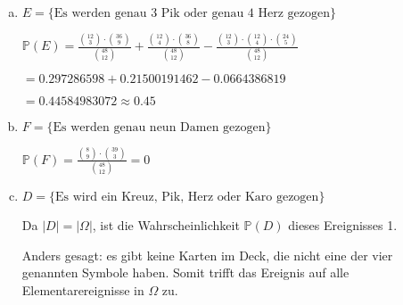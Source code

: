 \documentclass[a4paper,12pt]{article}
\begin{document}
\begin{enumerate}[(a)]
        \item
        $ E = \{\text{Es werden genau 3 Pik oder genau 4 Herz gezogen}\} $

        $ \displaystyle \mathbb{P}(E) = \frac{\binom{12}{3} \cdot \binom{36}{9}}{\binom{48}{12}} + \frac{\binom{12}{4} \cdot \binom{36}{8}}{\binom{48}{12}} - \frac{\binom{12}{3} \cdot \binom{12}{4} \cdot \binom{24}{5}}{\binom{48}{12}} $

        $ = 0.297286598 + 0.21500191462 - 0.0664386819 $

        $ = 0.44584983072 \approx 0.45 $

        \item
        $ F = \{\text{Es werden genau neun Damen gezogen}\} $

        $ \displaystyle \mathbb{P}(F) = \frac{\binom{8}{9} \cdot \binom{39}{3}}{\binom{48}{12}} = 0 $

        \item
        $ D = \{\text{Es wird ein Kreuz, Pik, Herz oder Karo gezogen}\} $

        Da $ |D| = |\Omega| $, ist die Wahrscheinlichkeit $ \mathbb{P}(D) $ dieses Ereignisses 1.

        Anders gesagt: es gibt keine Karten im Deck, die nicht eine der vier genannten Symbole haben. 
        Somit trifft das Ereignis auf alle Elementarereignisse in $ \Omega $ zu.
    \end{enumerate}
\end{document}
